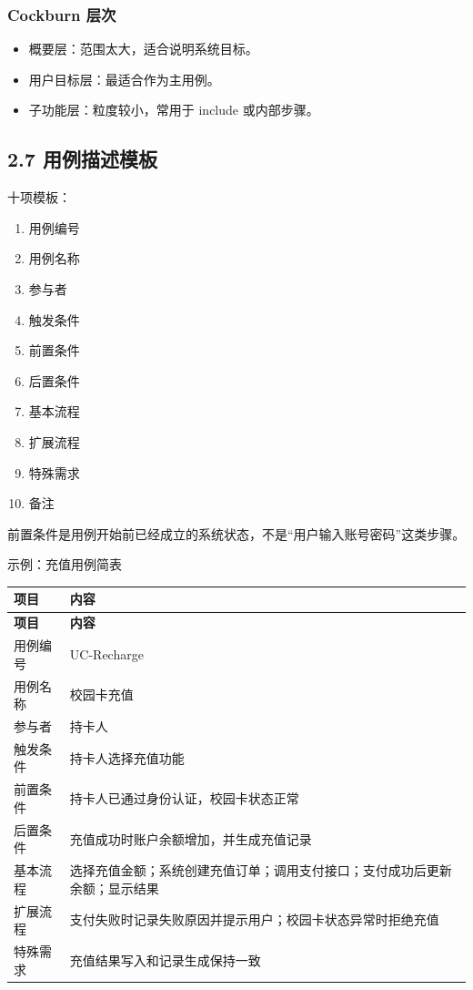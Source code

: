 \documentclass[UTF8,zihao=-4]{ctexart}
\begin{document}
\subsubsection{Cockburn 层次}

\begin{itemize}
\item 概要层：范围太大，适合说明系统目标。
\item 用户目标层：最适合作为主用例。
\item 子功能层：粒度较小，常用于 include 或内部步骤。
\end{itemize}

\subsection{2.7 用例描述模板}

十项模板：

\begin{enumerate}
\item 用例编号
\item 用例名称
\item 参与者
\item 触发条件
\item 前置条件
\item 后置条件
\item 基本流程
\item 扩展流程
\item 特殊需求
\item 备注
\end{enumerate}

前置条件是用例开始前已经成立的系统状态，不是“用户输入账号密码”这类步骤。

示例：充值用例简表

\begin{longtable}{|>{\raggedright\arraybackslash}p{}|>{\raggedright\arraybackslash}p{}|}
\hline
\textbf{项目} & \textbf{内容} \\
\hline
\endfirsthead
\hline
\textbf{项目} & \textbf{内容} \\
\hline
\endhead
用例编号 & UC-Recharge \\
\hline
用例名称 & 校园卡充值 \\
\hline
参与者 & 持卡人 \\
\hline
触发条件 & 持卡人选择充值功能 \\
\hline
前置条件 & 持卡人已通过身份认证，校园卡状态正常 \\
\hline
后置条件 & 充值成功时账户余额增加，并生成充值记录 \\
\hline
基本流程 & 选择充值金额；系统创建充值订单；调用支付接口；支付成功后更新余额；显示结果 \\
\hline
扩展流程 & 支付失败时记录失败原因并提示用户；校园卡状态异常时拒绝充值 \\
\hline
特殊需求 & 充值结果写入和记录生成保持一致 \\
\hline
\end{longtable}
\end{document}
